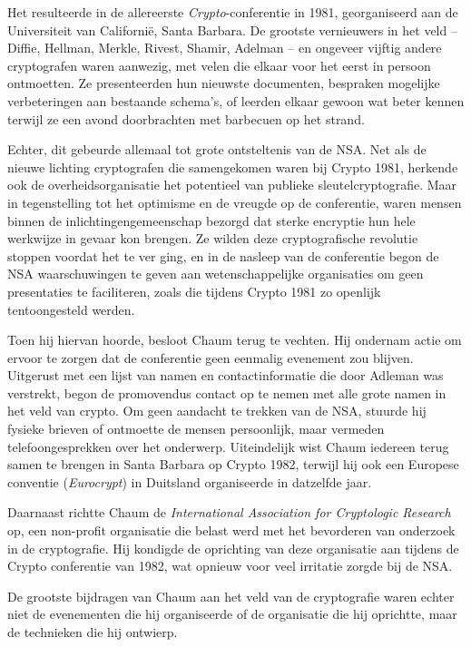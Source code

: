 \documentclass[smalldemyvopaper,11pt,twoside,onecolumn,openright,extrafontsizes,hidelinks]{memoir}
\begin{document}
Het resulteerde in de allereerste \emph{Crypto}-conferentie in 1981,
georganiseerd aan de Universiteit van Californië, Santa Barbara. De
grootste vernieuwers in het veld -- Diffie, Hellman, Merkle, Rivest,
Shamir, Adelman -- en ongeveer vijftig andere cryptografen waren
aanwezig, met velen die elkaar voor het eerst in persoon ontmoetten. Ze
presenteerden hun nieuwste documenten, bespraken mogelijke verbeteringen
aan bestaande schema's, of leerden elkaar gewoon wat beter kennen
terwijl ze een avond doorbrachten met barbecuen op het strand.

Echter, dit gebeurde allemaal tot grote ontsteltenis van de NSA. Net als
de nieuwe lichting cryptografen die samengekomen waren bij Crypto 1981,
herkende ook de overheidsorganisatie het potentieel van publieke
sleutelcryptografie. Maar in tegenstelling tot het optimisme en de
vreugde op de conferentie, waren mensen binnen de
inlichtingengemeenschap bezorgd dat sterke encryptie hun hele werkwijze
in gevaar kon brengen. Ze wilden deze cryptografische revolutie stoppen
voordat het te ver ging, en in de nasleep van de conferentie begon de
NSA waarschuwingen te geven aan wetenschappelijke organisaties om geen
presentaties te faciliteren, zoals die tijdens Crypto 1981 zo openlijk
tentoongesteld werden.

Toen hij hiervan hoorde, besloot Chaum terug te vechten. Hij ondernam
actie om ervoor te zorgen dat de conferentie geen eenmalig evenement zou
blijven. Uitgerust met een lijst van namen en contactinformatie die door
Adleman was verstrekt, begon de promovendus contact op te nemen met alle
grote namen in het veld van crypto. Om geen aandacht te trekken van de
NSA, stuurde hij fysieke brieven of ontmoette de mensen persoonlijk,
maar vermeden telefoongesprekken over het onderwerp. Uiteindelijk wist
Chaum iedereen terug samen te brengen in Santa Barbara op Crypto 1982,
terwijl hij ook een Europese conventie (\emph{Eurocrypt}) in Duitsland
organiseerde in datzelfde jaar.

Daarnaast richtte Chaum de \emph{International Association for
Cryptologic Research} op, een non-profit organisatie die belast werd met
het bevorderen van onderzoek in de cryptografie. Hij kondigde de
oprichting van deze organisatie aan tijdens de Crypto conferentie van
1982, wat opnieuw voor veel irritatie zorgde bij de NSA.

De grootste bijdragen van Chaum aan het veld van de cryptografie waren
echter niet de evenementen die hij organiseerde of de organisatie die
hij oprichtte, maar de technieken die hij ontwierp.
\end{document}
